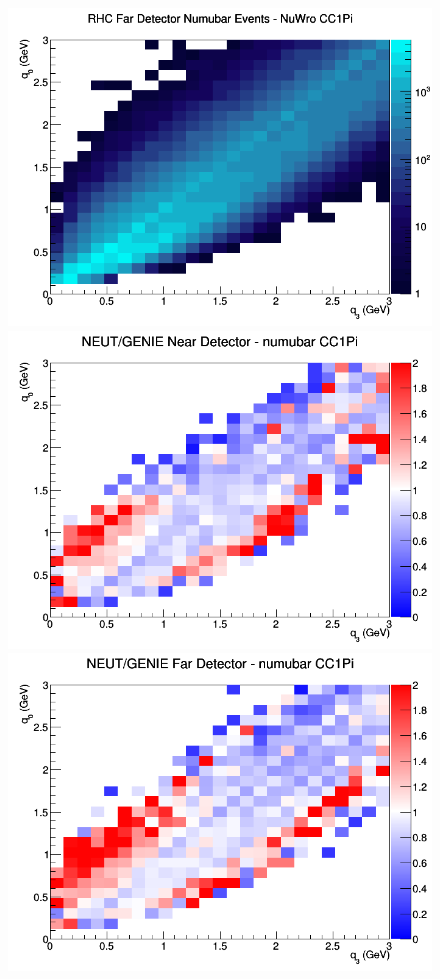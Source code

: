\begin{figure}[h]
\endminipage
{}
\includegraphics[width=\linewidth]{eff_q0_q3/GAr/CC1Pi_RHC_FD_numubar_q3_q0_NuWro.png}
\endminipage
\newline
{}
\includegraphics[width=\linewidth]{eff_q0_q3/GAr/ratios/CC1Pi_NEUT_GENIE_numubar_near_q3_q0.png}
\endminipage
{}
\includegraphics[width=\linewidth]{eff_q0_q3/GAr/ratios/CC1Pi_NEUT_GENIE_numubar_far_q3_q0.png}

\end{figure}
